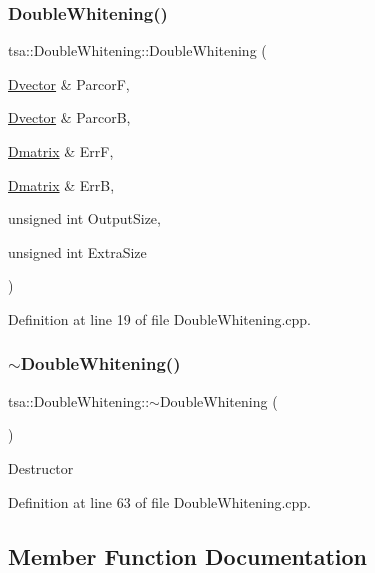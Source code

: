 \subsubsection{\texorpdfstring{Double\+Whitening()}{DoubleWhitening()}\hspace{0.1cm}{\footnotesize\ttfamily [2/2]}}
{\footnotesize\ttfamily tsa\+::\+Double\+Whitening\+::\+Double\+Whitening (\begin{DoxyParamCaption}\item[{\hyperlink{namespacetsa_a8900fb03d849baf447a1a0efe2561fb2}{Dvector} \&}]{ParcorF,  }\item[{\hyperlink{namespacetsa_a8900fb03d849baf447a1a0efe2561fb2}{Dvector} \&}]{ParcorB,  }\item[{\hyperlink{namespacetsa_ad260cd21c1891c4ed391fe788569aba4}{Dmatrix} \&}]{ErrF,  }\item[{\hyperlink{namespacetsa_ad260cd21c1891c4ed391fe788569aba4}{Dmatrix} \&}]{ErrB,  }\item[{unsigned int}]{Output\+Size,  }\item[{unsigned int}]{Extra\+Size }\end{DoxyParamCaption})}



Definition at line 19 of file Double\+Whitening.\+cpp.

\mbox{\label{classtsa_1_1_double_whitening_a313995cfbaec5ed83333b0b63214270b}} 
\subsubsection{\texorpdfstring{$\sim$\+Double\+Whitening()}{~DoubleWhitening()}}
{\footnotesize\ttfamily tsa\+::\+Double\+Whitening\+::$\sim$\+Double\+Whitening (\begin{DoxyParamCaption}{ }\end{DoxyParamCaption})\hspace{0.3cm}{\ttfamily [virtual]}}

Destructor 

Definition at line 63 of file Double\+Whitening.\+cpp.



\subsection{Member Function Documentation}
\mbox{\label{classtsa_1_1_double_whitening_abd1b553bad47599218970e1528b6c66a}} 

